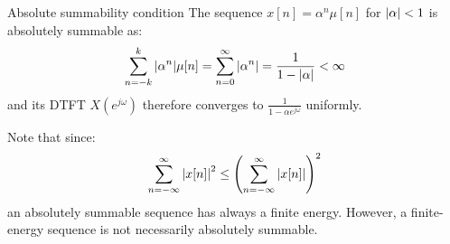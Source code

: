 \documentclass[../../main/main.tex]{subfiles}
\begin{document}
\begin{example}{Absolute summability condition}
    The sequence \( x[n] = \alpha^{n} \mu[n] \) for \( \abs{\alpha} < 1 \) is  absolutely summable as:
    \begin{equation}
        \sum_{n=-k}^{k} \abs{\alpha^{n}} \mu[n]
        =
        \sum_{n=0}^{\infty} \abs{\alpha^{n}}
        =
        \frac{1}{1 - \abs{\alpha}}
        <
        \infty
        \label{eq:L08_S33_1}
    \end{equation}
    and its DTFT \( X(e^{j\omega}) \) therefore converges to \( \frac{1}{1 - \alpha e^{j\omega}} \) uniformly.
\end{example}

Note that since:
\begin{equation}
    \sum_{n=-\infty}^{\infty} \abs{x[n]}^2
    \le
    \qty(\sum_{n=-\infty}^{\infty} \abs{x[n]})^2
    \label{eq:L08_S33_1}
\end{equation}
an absolutely summable sequence has always a finite energy. However, a finite-energy sequence is not necessarily absolutely summable.
\end{document}
